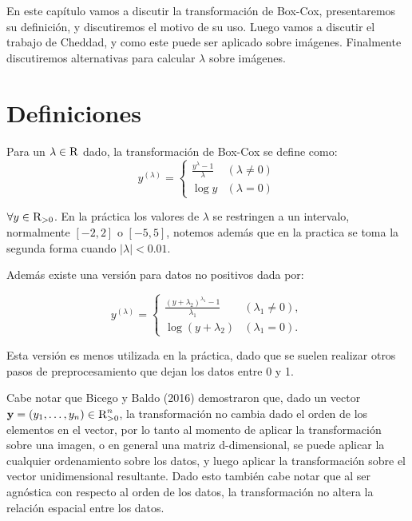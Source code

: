     En este cap\'itulo vamos a discutir la transformaci\'on de Box-Cox, presentaremos su definici\'on, y discutiremos el motivo de su uso. Luego vamos a discutir el trabajo de Cheddad\cite{boxcoximg}, y como este puede ser aplicado sobre im\'agenes. Finalmente discutiremos alternativas para calcular $\lambda$ sobre im\'agenes.
    
    \section{Definiciones}
    Para un $\lambda\in\textsc{R}$ dado, la transformaci\'on de Box-Cox se define como:
    \begin{equation}\label{Box-Cox}
        y^{(\lambda)}= \begin{cases}\frac{y^{\lambda}-1}{\lambda} & (\lambda \neq 0) \\ \log y & (\lambda=0)\end{cases}
    \end{equation}
    
    $\forall y\in\textsc{R}_{>0}$. En la pr\'actica los valores de $\lambda$ se restringen a un intervalo, normalmente $[-2,2]$ o $[-5,5]$, notemos adem\'as que en la practica se toma la segunda forma cuando $|\lambda|<0.01$\cite{boxcoximg}.
    
    Adem\'as existe una versi\'on para datos no positivos dada por:

    $$
    y^{(\lambda)}= \begin{cases}\frac{\left(y+\lambda_{2}\right)^{\lambda_{1}}-1}{\lambda_{1}} & \left(\lambda_{1} \neq 0\right), \\ \log \left(y+\lambda_{2}\right) & \left(\lambda_{1}=0\right) .\end{cases}
    $$

    Esta versi\'on es menos utilizada en la pr\'actica, dado que se suelen realizar otros pasos de preprocesamiento que dejan los datos entre 0 y 1.
    
    Cabe notar que Bicego y Baldo (2016)\cite{bicego2016} demostraron que, dado un vector $\textbf{y}=(y_1,\dots,y_n)\in\textsc{R}^n_{>0}$, la transformaci\'on no cambia dado el orden de los elementos en el vector, por lo tanto al momento de aplicar la transformaci\'on sobre una imagen, o en general una matriz d-dimensional, se puede aplicar la cualquier ordenamiento sobre los datos, y luego aplicar la transformaci\'on sobre el vector unidimensional resultante. Dado esto tambi\'en cabe notar que al ser agn\'ostica con respecto al orden de los datos, la transformaci\'on no altera la relaci\'on espacial entre los datos.
    
